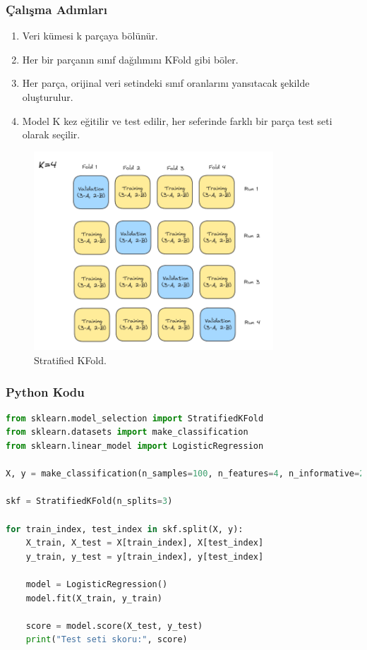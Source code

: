 \subsubsection{Çalışma Adımları}
\begin{enumerate}
    \item Veri kümesi k parçaya bölünür.
    \item Her bir parçanın sınıf dağılımını KFold gibi böler.
    \item Her parça, orijinal veri setindeki sınıf oranlarını yansıtacak şekilde oluşturulur.
    \item Model K kez eğitilir ve test edilir, her seferinde farklı bir parça test seti olarak seçilir.
\end{enumerate}

\begin{figure}[h]
    \centering
    \includegraphics[width=0.8\textwidth]{images/stratified_kfold_structure.png}
    \caption{Stratified KFold.}
    \label{fig:enter-label}
\end{figure}

\subsubsection{Python Kodu}

\begin{lstlisting}[language=Python, caption=Scikit-learn'de Stratified KFold örneği.]
from sklearn.model_selection import StratifiedKFold
from sklearn.datasets import make_classification
from sklearn.linear_model import LogisticRegression

X, y = make_classification(n_samples=100, n_features=4, n_informative=2, n_redundant=0, random_state=42, n_classes=2)

skf = StratifiedKFold(n_splits=3)

for train_index, test_index in skf.split(X, y):
    X_train, X_test = X[train_index], X[test_index]
    y_train, y_test = y[train_index], y[test_index]
    
    model = LogisticRegression()
    model.fit(X_train, y_train)
    
    score = model.score(X_test, y_test)
    print("Test seti skoru:", score)
\end{lstlisting}

